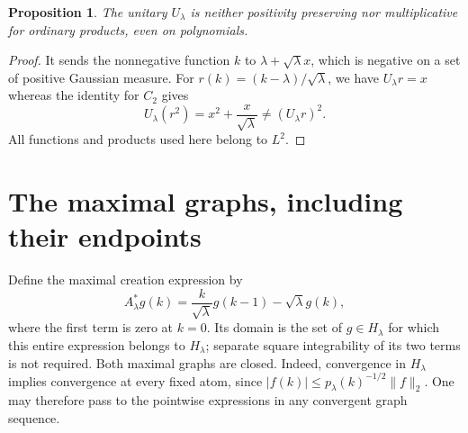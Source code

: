 \documentclass[11pt]{article}
\newtheorem{proposition}[theorem]{Proposition}
\begin{document}
\begin{proposition}\label{prop:product}
The unitary $U_\lambda$ is neither positivity preserving nor
multiplicative for ordinary products, even on polynomials.
\end{proposition}
\begin{proof}
It sends the nonnegative function $k$ to $\lambda+\sqrt\lambda x$,
which is negative on a set of positive Gaussian measure. For
$r(k)=(k-\lambda)/\sqrt\lambda$, we have $U_\lambda r=x$ whereas
the identity for $C_2$ gives
\[
 U_\lambda(r^2)=x^2+\frac{x}{\sqrt\lambda}\ne (U_\lambda r)^2.
\]
All functions and products used here belong to $L^2$.
\end{proof}

\section{The maximal graphs, including their endpoints}
Define the maximal creation expression by
\begin{equation}\label{eq:creation}
 A_\lambda^*g(k)=\frac{k}{\sqrt\lambda}g(k-1)-\sqrt\lambda g(k),
\end{equation}
where the first term is zero at $k=0$. Its domain is the set of
$g\in H_\lambda$ for which this entire expression belongs to
$H_\lambda$; separate square integrability of its two terms is not
required. Both maximal graphs are closed. Indeed, convergence in
$H_\lambda$ implies convergence at every fixed atom, since
$|f(k)|\leq p_\lambda(k)^{-1/2}\|f\|_2$. One may therefore pass to
the pointwise expressions in any convergent graph sequence.
\end{document}
